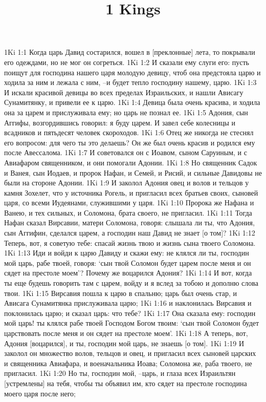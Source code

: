 

\title{1 Kings}

1Ki 1:1  Когда царь Давид состарился, вошел в [преклонные] лета, то покрывали его одеждами, но не мог он согреться.
1Ki 1:2  И сказали ему слуги его: пусть поищут для господина нашего царя молодую девицу, чтоб она предстояла царю и ходила за ним и лежала с ним, --и будет тепло господину нашему, царю.
1Ki 1:3  И искали красивой девицы во всех пределах Израильских, и нашли Ависагу Сунамитянку, и привели ее к царю.
1Ki 1:4  Девица была очень красива, и ходила она за царем и прислуживала ему; но царь не познал ее.
1Ki 1:5  Адония, сын Аггифы, возгордившись говорил: я буду царем. И завел себе колесницы и всадников и пятьдесят человек скороходов.
1Ki 1:6  Отец же никогда не стеснял его вопросом: для чего ты это делаешь? Он же был очень красив и родился ему после Авессалома.
1Ki 1:7  И советовался он с Иоавом, сыном Саруиным, и с Авиафаром священником, и они помогали Адонии.
1Ki 1:8  Но священник Садок и Ванея, сын Иодаев, и пророк Нафан, и Семей, и Рисий, и сильные Давидовы не были на стороне Адонии.
1Ki 1:9  И заколол Адония овец и волов и тельцов у камня Зохелет, что у источника Рогель, и пригласил всех братьев своих, сыновей царя, со всеми Иудеянами, служившими у царя.
1Ki 1:10  Пророка же Нафана и Ванею, и тех сильных, и Соломона, брата своего, не пригласил.
1Ki 1:11  Тогда Нафан сказал Вирсавии, матери Соломона, говоря: слышала ли ты, что Адония, сын Аггифин, сделался царем, а господин наш Давид не знает [о том]?
1Ki 1:12  Теперь, вот, я советую тебе: спасай жизнь твою и жизнь сына твоего Соломона.
1Ki 1:13  Иди и войди к царю Давиду и скажи ему: не клялся ли ты, господин мой царь, рабе твоей, говоря: `сын твой Соломон будет царем после меня и он сядет на престоле моем'? Почему же воцарился Адония?
1Ki 1:14  И вот, когда ты еще будешь говорить там с царем, войду и я вслед за тобою и дополню слова твои.
1Ki 1:15  Вирсавия пошла к царю в спальню; царь был очень стар, и Ависага Сунамитянка прислуживала царю;
1Ki 1:16  и наклонилась Вирсавия и поклонилась царю; и сказал царь: что тебе?
1Ki 1:17  Она сказала ему: господин мой царь! ты клялся рабе твоей Господом Богом твоим: `сын твой Соломон будет царствовать после меня и он сядет на престоле моем'.
1Ki 1:18  А теперь, вот, Адония [воцарился], и ты, господин мой царь, не знаешь [о том].
1Ki 1:19  И заколол он множество волов, тельцов и овец, и пригласил всех сыновей царских и священника Авиафара, и военачальника Иоава; Соломона же, раба твоего, не пригласил.
1Ki 1:20  Но ты, господин мой, --царь, и глаза всех Израильтян [устремлены] на тебя, чтобы ты объявил им, кто сядет на престоле господина моего царя после него;
